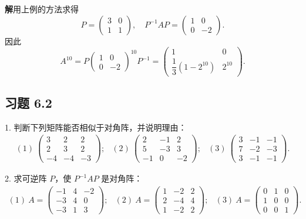 \documentclass[UTF8, 12pt, fontset=fandol, oneside]{ctexart}
\begin{document}
\noindent\textbf{解}\quad 用上例的方法求得
\[
P=\left(\begin{array}{cc}
3 & 0\\
1 & 1
\end{array}\right),\quad
P^{-1}AP=\left(\begin{array}{cc}
1 & 0\\
0 & -2
\end{array}\right).
\]
因此
\[
A^{10}=P\left(\begin{array}{cc}
1 & 0\\
0 & -2
\end{array}\right)^{10}P^{-1}
=\left(\begin{array}{cc}
1 & 0\\
\dfrac{1}{3}(1-2^{10}) & 2^{10}
\end{array}\right).
\]

\subsection*{习题 6.2}

1. 判断下列矩阵能否相似于对角阵，并说明理由：
\[
\begin{array}{ccc}
(1)\ \left(\begin{array}{ccc}
3 & 2 & 2\\
2 & 3 & 2\\
-4 & -4 & -3
\end{array}\right);&
(2)\ \left(\begin{array}{ccc}
2 & -1 & 2\\
5 & -3 & 3\\
-1 & 0 & -2
\end{array}\right);&
(3)\ \left(\begin{array}{ccc}
3 & -1 & -1\\
7 & -2 & -3\\
3 & -1 & -1
\end{array}\right).
\end{array}
\]

2. 求可逆阵 $P$，使 $P^{-1}AP$ 是对角阵：
\[
\begin{array}{ccc}
(1)\ A=\left(\begin{array}{ccc}
-1 & 4 & -2\\
-3 & 4 & 0\\
-3 & 1 & 3
\end{array}\right);&
(2)\ A=\left(\begin{array}{ccc}
1 & -2 & 2\\
2 & -4 & 4\\
1 & -2 & 2
\end{array}\right);&
(3)\ A=\left(\begin{array}{ccc}
0 & 1 & 0\\
1 & 0 & 0\\
0 & 0 & 1
\end{array}\right).
\end{array}
\]
\end{document}
